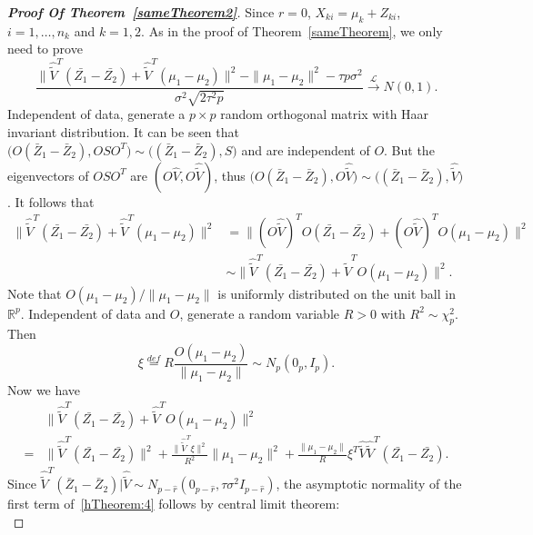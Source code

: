\documentclass[review]{elsarticle}
\theoremstyle{plain}
\theoremstyle{definition}
\theoremstyle{remark}
\begin{document}
\begin{proof}[\textbf{Proof Of Theorem~\ref{sameTheorem2}}]
    Since $r=0$, $X_{ki}=\mu_k+Z_{ki}$, $i=1,\ldots,n_k$ and $k=1,2$.
    As in the proof of Theorem~\ref{sameTheorem}, we only need to prove
    $$
    \frac{\|\hat{\tilde{V}}^T(\bar{Z_1}-\bar{Z_2})+\hat{\tilde{V}}^T(\mu_1-\mu_2)\|^2-\|\mu_1-\mu_2\|^2-\tau p \sigma^2}{\sigma^2\sqrt{2\tau^2 p}}\xrightarrow{\mathcal{L}}N(0,1).
    $$
    Independent of data, generate a $p\times p$ random orthogonal matrix with Haar invariant distribution. It can be seen that
    $
    \big(O(\bar{Z}_1-\bar{Z}_2), OSO^T\big)\sim
    \big((\bar{Z}_1-\bar{Z}_2), S\big)
    $ and are independent of $O$.
    But the eigenvectors of $OSO^T$ are $(O\hat{V},O\hat{\tilde{V}})$, thus
    $
    \big(O(\bar{Z}_1-\bar{Z}_2), O\hat{\tilde{V}}\big)\sim
    \big((\bar{Z}_1-\bar{Z}_2), \hat{\tilde{V}}\big)
    $.
    It follows that
    \begin{equation*}
    \begin{aligned}
\|\hat{\tilde{V}}^T(\bar{Z_1}-\bar{Z_2})+\hat{\tilde{V}}^T(\mu_1-\mu_2)\|^2
        &=
    \|(O\hat{\tilde{V}})^T O(\bar{Z_1}-\bar{Z_2})+(O\hat{\tilde{V}})^T O(\mu_1-\mu_2)\|^2\\
        &\sim
\|\hat{\tilde{V}}^T(\bar{Z_1}-\bar{Z_2})+\hat{\tilde{V}}^T O(\mu_1-\mu_2)\|^2.
\end{aligned}
\end{equation*}
    Note that $O(\mu_1-\mu_2)/\|\mu_1-\mu_2\|$ is uniformly distributed on the unit ball in $\mathbb{R}^p$. Independent of data and $O$, generate a random variable $R>0$ with $R^2\sim\chi^2_p$. Then 
    $$
    \xi \overset{def}{=} R \frac{O(\mu_1-\mu_2)}{\|\mu_1-\mu_2\|}\sim N_p(0_p,I_p).
    $$
Now we have
    \begin{equation}\label{hTheorem:4}
\begin{aligned}
    &\|\hat{\tilde{V}}^T(\bar{Z_1}-\bar{Z_2})+\hat{\tilde{V}}^T O(\mu_1-\mu_2)\|^2\\
    =&
    \|\hat{\tilde{V}}^T(\bar{Z_1}-\bar{Z_2})\|^2+\frac{\|\hat{\tilde{V}}^T\xi\|^2}{R^2}\|\mu_1-\mu_2\|^2+\frac{\|\mu_1-\mu_2\|}{R}\xi^T\hat{\tilde{V}}\hat{\tilde{V}}^T(\bar{Z_1}-\bar{Z_2}).
\end{aligned}
\end{equation}
    Since $\hat{\tilde{V}}^T(\bar{Z}_1-\bar{Z}_2)|\hat{\tilde{V}}\sim N_{p-\hat{r}}(0_{p-\hat{r}},\tau\sigma^2 I_{p-\hat{r}})$, the asymptotic normality of the first term of~\eqref{hTheorem:4} follows by central limit theorem:
    \begin{equation}\label{hTheorem:1}

\end{equation}
\end{proof}
\end{document}
